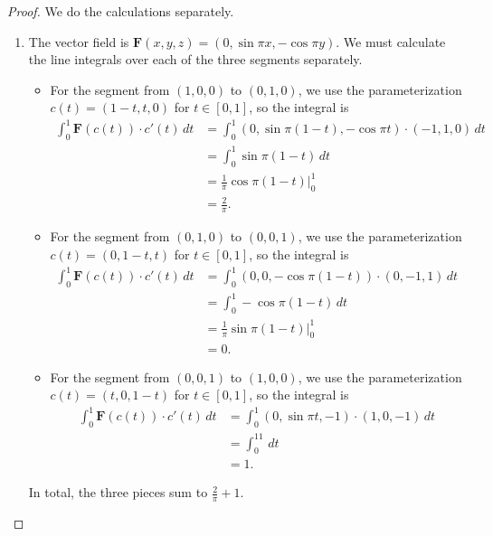 \documentclass[openany]{book}
\begin{document}
\begin{proof}
    We do the calculations separately.
    \begin{enumerate}
        \item[(a)] The vector field is $\mathbf F(x,y,z)=(0,\sin\pi x,-\cos\pi y)$. We must calculate the line integrals over each of the three segments separately.
        \begin{itemize}
            \item For the segment from $(1,0,0)$ to $(0,1,0)$, we use the parameterization $c(t)=(1-t,t,0)$ for $t\in[0,1]$, so the integral is
            \begin{align*}
                \int_0^1\mathbf F(c(t))\cdot c'(t)\,dt &= \int_0^1(0,\sin\pi (1-t),-\cos\pi t)\cdot (-1,1,0)\,dt \\
                &= \int_0^1\sin\pi (1-t)\,dt \\
                &= \frac1\pi\cos\pi(1-t)\bigg|_0^1 \\
                &= \frac2\pi.
            \end{align*}

            \item For the segment from $(0,1,0)$ to $(0,0,1)$, we use the parameterization $c(t)=(0,1-t,t)$ for $t\in[0,1]$, so the integral is
            \begin{align*}
                \int_0^1\mathbf F(c(t))\cdot c'(t)\,dt &= \int_0^1(0,0,-\cos\pi (1-t))\cdot (0,-1,1)\,dt \\
                &= \int_0^1-\cos\pi (1-t)\,dt \\
                &= \frac1\pi\sin\pi(1-t)\bigg|_0^1 \\
                &= 0.
            \end{align*}

            \item For the segment from $(0,0,1)$ to $(1,0,0)$, we use the parameterization $c(t)=(t,0,1-t)$ for $t\in[0,1]$, so the integral is
            \begin{align*}
                \int_0^1\mathbf F(c(t))\cdot c'(t)\,dt &= \int_0^1(0,\sin\pi t,-1)\cdot (1,0,-1)\,dt \\
                &= \int_0^11\,dt \\
                &= 1.
            \end{align*}
        \end{itemize}
        In total, the three pieces sum to $\frac2\pi+1$.


\end{enumerate}
\end{proof}
\end{document}
